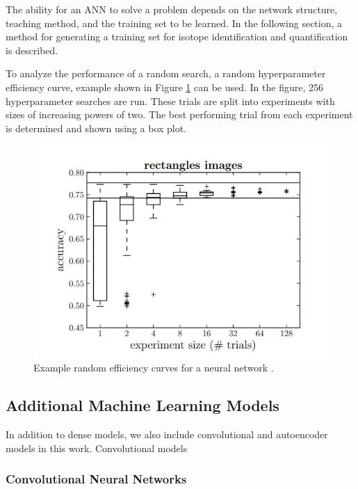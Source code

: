 The ability for an ANN to solve a problem depends on the network structure, teaching method, and the training set to be learned. In the following section, a method for generating a training set for isotope identification and quantification is described.

To analyze the performance of a random search, a random hyperparameter efficiency curve, example shown in Figure \ref{fig:Bergstra_random_efficiency_curve_DNN} can be used. In the figure, 256 hyperparameter searches are run. These trials are split into experiments with sizes of increasing powers of two. The best performing trial from each experiment is determined and shown using a box plot.


\begin{figure}[H]
	\centering
	\includegraphics[width=0.9\linewidth]{model_choice_hyperparameter_search_images/Bergstra12_random_efficiency_curve}
	\caption{Example random efficiency curves for a neural network \cite{Bergstra2012}.}
	\label{fig:Bergstra_random_efficiency_curve_DNN}
\end{figure}

\subsection{Additional Machine Learning Models}

In addition to dense models, we also include convolutional and autoencoder models in this work. Convolutional models 

\subsubsection{Convolutional Neural Networks}

